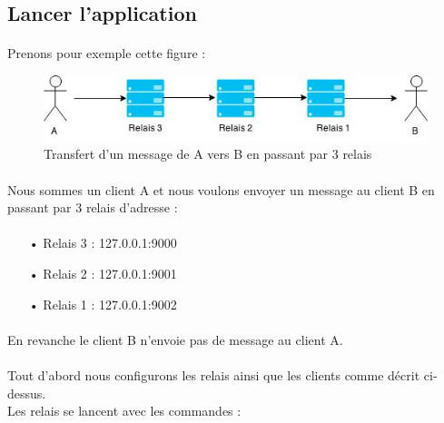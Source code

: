 \documentclass[a4paper,12pt]{report}
\begin{document}
	\subsection{Lancer l'application}
	\paragraph*{}
	Prenons pour exemple cette figure :
	
	\begin{figure}[h] %
		\includegraphics[scale=0.8]{project.jpg}
		\caption{Transfert d'un message de A vers B en passant par 3 relais}
		\label{project}
	\end{figure}
	
	\paragraph*{}
	Nous sommes un client A et nous voulons envoyer un message au client B en passant par 3 relais d'adresse :
	
	\paragraph*{}
	\begin{itemize}
		\item[•]Relais 3 : 127.0.0.1:9000
		\item[•]Relais 2 : 127.0.0.1:9001
		\item[•]Relais 1 : 127.0.0.1:9002
	\end{itemize}
	
	\paragraph*{}
	En revanche le client B n'envoie pas de message au client A.
	
	\paragraph*{}
	Tout d'abord nous configurons les relais ainsi que les clients comme décrit ci-dessus. \\
	Les relais se lancent avec les commandes :
	
\end{document}
